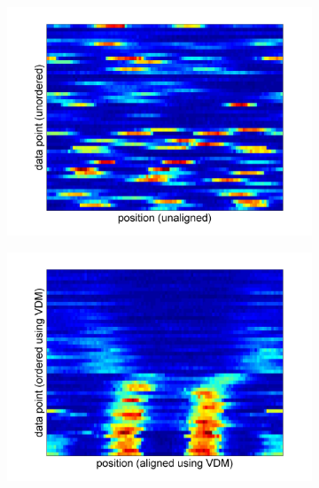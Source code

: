 \documentclass[10pt]{article}
\begin{document}
\begin{figure}[H]
\begin{subfigure}{0.3\textwidth}
\includegraphics[width=\textwidth]{data_unaligned_unordered}
\caption{}
\end{subfigure}
\begin{subfigure}{0.3\textwidth}
\includegraphics[width=\textwidth]{data_ordered_vdm}
\caption{}
\end{subfigure}
\begin{subfigure}{0.3\textwidth}

\end{subfigure}
\end{figure}
\end{document}
